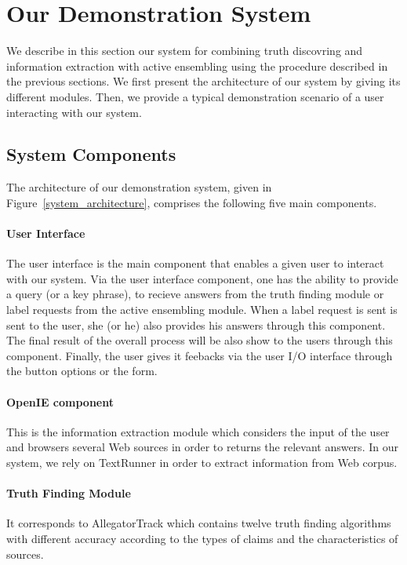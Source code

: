\section{Our Demonstration System}\label{demonstration}
We describe in this section our system for 
combining truth discovring and information
extraction with active ensembling using the procedure described
in the previous sections. We first 
present the architecture of our system by
giving its different modules. Then, we provide
a typical demonstration scenario of a user interacting
with our system.


\subsection{System Components}
The architecture of our demonstration system, given in
Figure~\ref{system_architecture}, comprises the following
five main components.

\paragraph*{User Interface}
The user interface is the main component that enables a given user 
to interact with our system. Via the user interface component, 
one has the ability to provide a query (or a key phrase), to
recieve answers from the truth finding module or  label requests
from the active ensembling module. When a label request is sent 
is sent to the user, she (or he) also provides his answers through 
this component.
The final result of the 
overall process will be also show to the users through this component.
Finally, the user gives it feebacks via the user I/O interface through
the button options or the form.

\paragraph*{OpenIE component} This is the information 
extraction module which considers the input of the user and browsers
several Web sources in order to returns the relevant answers. In our 
system, we rely on TextRunner in order to extract information from Web corpus.

\paragraph*{Truth Finding Module} It corresponds to AllegatorTrack which contains
twelve truth finding algorithms with different accuracy according to the types of 
claims and the characteristics of sources.

